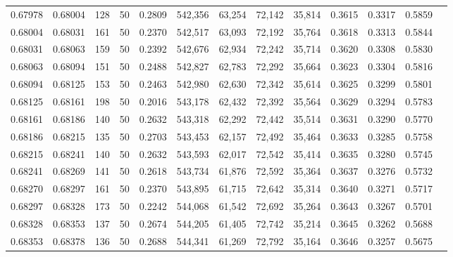 \begin{tabular}{rrrrrrrrrrrrr}
0.67978 & 0.68004 &   128 &  50 &                                     0.2809 & 542,356 &  63,254 &  72,142 &  35,814 & 0.3615 & 0.3317 & 0.5859 \\
0.68004 & 0.68031 &   161 &  50 &                                     0.2370 & 542,517 &  63,093 &  72,192 &  35,764 & 0.3618 & 0.3313 & 0.5844 \\
0.68031 & 0.68063 &   159 &  50 &                                     0.2392 & 542,676 &  62,934 &  72,242 &  35,714 & 0.3620 & 0.3308 & 0.5830 \\
0.68063 & 0.68094 &   151 &  50 &                                     0.2488 & 542,827 &  62,783 &  72,292 &  35,664 & 0.3623 & 0.3304 & 0.5816 \\
0.68094 & 0.68125 &   153 &  50 &                                     0.2463 & 542,980 &  62,630 &  72,342 &  35,614 & 0.3625 & 0.3299 & 0.5801 \\
0.68125 & 0.68161 &   198 &  50 &                                     0.2016 & 543,178 &  62,432 &  72,392 &  35,564 & 0.3629 & 0.3294 & 0.5783 \\
0.68161 & 0.68186 &   140 &  50 &                                     0.2632 & 543,318 &  62,292 &  72,442 &  35,514 & 0.3631 & 0.3290 & 0.5770 \\
0.68186 & 0.68215 &   135 &  50 &                                     0.2703 & 543,453 &  62,157 &  72,492 &  35,464 & 0.3633 & 0.3285 & 0.5758 \\
0.68215 & 0.68241 &   140 &  50 &                                     0.2632 & 543,593 &  62,017 &  72,542 &  35,414 & 0.3635 & 0.3280 & 0.5745 \\
0.68241 & 0.68269 &   141 &  50 &                                     0.2618 & 543,734 &  61,876 &  72,592 &  35,364 & 0.3637 & 0.3276 & 0.5732 \\
0.68270 & 0.68297 &   161 &  50 &                                     0.2370 & 543,895 &  61,715 &  72,642 &  35,314 & 0.3640 & 0.3271 & 0.5717 \\
0.68297 & 0.68328 &   173 &  50 &                                     0.2242 & 544,068 &  61,542 &  72,692 &  35,264 & 0.3643 & 0.3267 & 0.5701 \\
0.68328 & 0.68353 &   137 &  50 &                                     0.2674 & 544,205 &  61,405 &  72,742 &  35,214 & 0.3645 & 0.3262 & 0.5688 \\
0.68353 & 0.68378 &   136 &  50 &                                     0.2688 & 544,341 &  61,269 &  72,792 &  35,164 & 0.3646 & 0.3257 & 0.5675 \\

\end{tabular}
